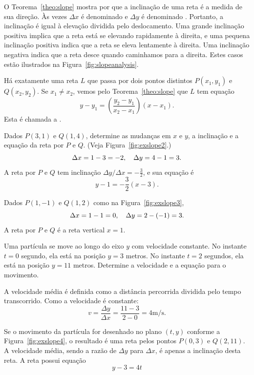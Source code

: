 O Teorema~\ref{theo:slope} mostra por que a inclinação de uma
reta é a medida de sua direção. Às vezes $\Delta x$ é denominado
 e $\Delta y$ é denominado
. Portanto, a inclinação é igual à elevação
dividida pelo deslocamento. Uma grande inclinação positiva
implica que a reta está se elevando rapidamente à direita,
e uma pequena inclinação positiva indica que a reta se eleva
lentamente à direita. Uma inclinação negativa indica que a
reta desce quando caminhamos para a direita. Estes casos estão
ilustrados na Figura~\ref{fig:slopeanalysis}.


Há exatamente uma reta $L$ que passa por dois pontos distintos
$P(x_1, y_1)$ e $Q(x_2, y_2)$. Se $x_1 \ne x_2$, vemos pelo
Teorema~\ref{theo:slope} que $L$ tem equação
\[
  y - y_1 = \left( \frac{y_2 - y_1}{x_2 - x_1} \right) (x - x_1).
\]
Esta é chamada a .

\begin{example}
Dados $P(3, 1)$ e $Q(1, 4)$, determine as mudanças em $x$ e $y$,
a inclinação e a equação da reta por $P$ e $Q$. (Veja
Figura~\ref{fig:exslope2}.)
\[
  \Delta x = 1 - 3 = -2, \hspace{1em} \Delta y = 4 - 1 = 3.
\]
A reta por $P$ e $Q$ tem inclinação $\Delta y / \Delta x = -\frac{3}{2}$,
e sua equação é
\[
  y - 1 = -\frac{3}{2}(x-3).
\]
\end{example}


\begin{example}
Dados $P(1, -1)$ e $Q(1, 2)$ como na Figura~\ref{fig:exslope3},
\[
  \Delta x = 1 - 1 = 0, \hspace{1em} \Delta y = 2 - (-1) = 3.
\]
A reta por $P$ e $Q$ é a reta vertical $x = 1$.
\end{example}


\begin{example}
Uma partícula se move ao longo do eixo $y$ com velocidade
constante. No instante $t=0$ segundo, ela está na posição
$y = 3$ metros. No instante $t = 2$ segundos, ela está na
posição $y = 11$ metros. Determine a velocidade e a
equação para o movimento.

A velocidade média é definida como a distância percorrida dividida
pelo tempo transcorrido. Como a velocidade é constante:
\[
  v = \frac{\Delta y}{\Delta x} = \frac{11-3}{2-0} = 4 \text{m/s}.
\]

Se o movimento da partícula for desenhado no plano $(t, y)$
conforme a Figura~\ref{fig:exslope4}, o resultado é uma reta
pelos pontos $P(0, 3)$ e $Q(2, 11)$. A velocidade média,
sendo a razão de $\Delta y$ para $\Delta x$, é apenas a
inclinação desta reta. A reta possui equação
\[
  y - 3 = 4t
\]
\end{example}

